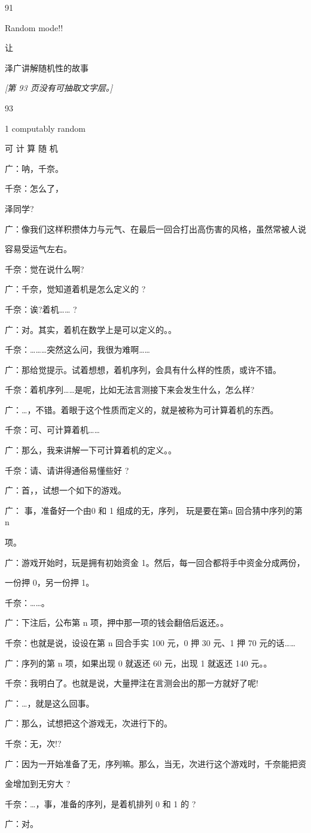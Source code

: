 91\par
Random mode!!\par
让\par
泽广讲解随机性的故事\par

\noindent\textit{[第 93 页没有可抽取文字层。]}\par

93\par
1 computably random\par
可 计 算 随 机\par
广：呐，千奈。\par
千奈：怎么了，\par
泽同学?\par
广：像我们这样积攒体力与元气、在最后一回合打出高伤害的风格，虽然常被人说\par
容易受运气左右。\par
千奈：觉在说什么啊?\par
广：千奈，觉知道着机是怎么定义的 ?\par
千奈：诶?着机…… ?\par
广：对。其实，着机在数学上是可以定义的。。\par
千奈：………突然这么问，我很为难啊……\par
广：那给觉提示。试着想想，着机序列，会具有什么样的性质，或许不错。\par
千奈：着机序列……是呢，比如无法言测接下来会发生什么，怎么样?\par
广：…，不错。着眼于这个性质而定义的，就是被称为可计算着机的东西。\par
千奈：可、可计算着机……\par
广：那么，我来讲解一下可计算着机的定义。。\par
千奈：请、请讲得通俗易懂些好 ?\par
广：首，，试想一个如下的游戏。\par
广： 事，准备好一个由0 和 1 组成的无，序列， 玩是要在第n 回合猜中序列的第 n\par
项。\par
广：游戏开始时，玩是拥有初始资金 1。然后，每一回合都将手中资金分成两份，\par
一份押 0，另一份押 1。\par
千奈：……。\par
广：下注后，公布第 n 项，押中那一项的钱会翻倍后返还。。\par
千奈：也就是说，设设在第 n 回合手实 100 元，0 押 30 元、1 押 70 元的话……\par
广：序列的第 n 项，如果出现 0 就返还 60 元，出现 1 就返还 140 元。。\par
千奈：我明白了。也就是说，大量押注在言测会出的那一方就好了呢!\par
广：…，就是这么回事。\par
广：那么，试想把这个游戏无，次进行下的。\par
千奈：无，次!?\par
广：因为一开始准备了无，序列嘛。那么，当无，次进行这个游戏时，千奈能把资\par
金增加到无穷大 ?\par
千奈：…，事，准备的序列，是着机排列 0 和 1 的 ?\par
广：对。\par

